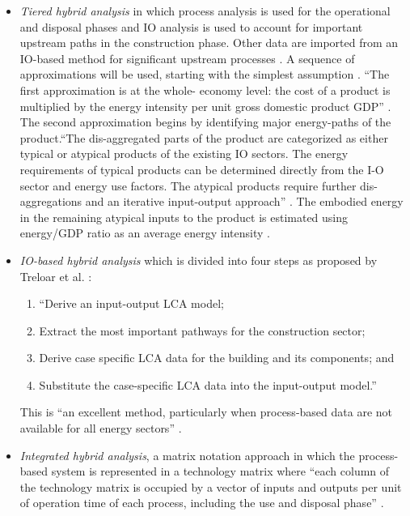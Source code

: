 \documentclass[10pt]{article}
\begin{document}
\begin{itemize}
  \item {\color{blue}\textit{Tiered hybrid analysis} in which process analysis is used for the operational and disposal phases and IO analysis is used to account for important upstream paths in the construction phase.} Other data are imported from an IO-based method for significant upstream processes \cite{suh2005methods}.   A sequence of approximations will be used, starting with the simplest assumption \cite{bullard1978net}. {\color{blue}``The first approximation is at the whole- economy level: the cost of a product is multiplied by the energy intensity per unit gross domestic product GDP''} \cite{bilec2006example}. The second approximation begins by identifying major energy-paths of the product.{\color{blue}``The dis-aggregated parts of the product are categorized as either typical or atypical products of the existing IO sectors. The energy requirements of typical products can be determined directly from the I-O sector and energy use factors. The atypical products require further dis-aggregations and an iterative input-output approach''} \cite{bilec2006example}. The embodied energy in the remaining atypical inputs to the product is estimated using energy/GDP ratio as an average energy intensity \cite{bullard1978net}.

  \item \textit{IO-based hybrid analysis} which is divided into four steps as proposed by Treloar et al. \cite{treloar2000hybrid}: 
  
  \begin{enumerate}
      \item ``Derive an input-output LCA model;
      \item Extract the most important pathways for the construction sector;
      \item Derive case specific LCA data for the building and its components; and
   \item Substitute the case-specific LCA data into the input-output model.'' \cite{treloar2000hybrid}
  \end{enumerate}
  
  This is ``an  excellent method, particularly when process-based data are not available for all energy sectors'' \cite{dixit2017embodied}.


\item {\color{blue}\textit{Integrated  hybrid  analysis}}, a matrix notation approach in which the process-based system is represented 
in a technology matrix where ``each column of the  technology matrix is occupied  by  a  vector  of  inputs  and  outputs  per  unit  of operation time of each process, including the use and disposal phase'' 
\cite{suh2004system}. %

\end{itemize}
\end{document}
